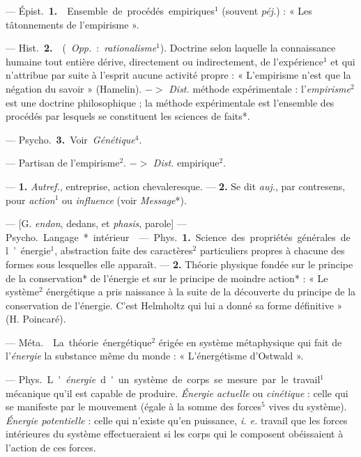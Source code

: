 \begin{itemize}[leftmargin=1cm, label=, itemsep=1pt]
 — \si{Épist.} {\bf 1.}  Ensemble de
procédés empiriques$^1$ (souvent  {\it péj.}) :
« Les tâtonnements de l’empirisme ».

— \si{Hist.} {\bf 2.}  ({\it Opp.}: {\it rationalisme}$^1$).
Doctrine selon laquelle la connaissance humaine tout entière dérive,
directement ou indirectement, de
l'expérience$^1$ et qui n’attribue par
suite à l'esprit aucune activité propre : « L’empirisme n’est que la
négation du savoir » (Hamelin).
$->$ {\it Dist.} méthode expérimentale : l'{\it empirisme}$^2$ est
une doctrine philosophique ; la méthode expérimentale est l'ensemble
des procédés par lesquels se constituent les sciences de faits*.

— \si{Psycho.} {\bf 3.} Voir {\it Génétique}$^4$.

 — Partisan de l'empirisme$^2$. $->$ {\it Dist.} empirique$^2$.

 — {\bf 1.} {\it Autref.}, entreprise, action chevaleresque. —
{\bf 2.} Se dit {\it auj.}, par contresens, pour {\it action}$^1$ ou {\it
influence} (voir {\it Message}*).

 — [G. {\it endon}, dedans, et {\it phasis}, parole]
— \si{Psycho.} Langage* intérieur.

 — \si{Phys.} {\bf 1.} Science des
propriétés générales de l’énergie$^1$,
abstraction faite des caractères$^2$
particuliers propres à chacune des
formes sous lesquelles elle apparaît.
— {\bf 2.} Théorie physique fondée sur
le principe de la conservation* de
l'énergie et sur le principe de moindre
action* : « Le système$^2$ énergétique
a pris naissance à la suite de la
découverte du principe
de la conservation de l'énergie. C’est
Helmholtz qui lui a donné sa forme
définitive » (H. Poincaré).

 — \si{Méta.}  La théorie
énergétique$^2$ érigée en système métaphysique qui fait de l'{\it énergie}
la substance même du monde : « L’énergétisme d'Ostwald ».

 — \si{Phys.} L'{\it énergie} d'un système de corps se mesure
par le travail$^1$ mécanique qu’il est capable
de produire. {\it Énergie actuelle} ou
{\it cinétique} : celle qui se manifeste par
le mouvement (égale à la somme
des forces$^5$ vives du système).
{\it Énergie potentielle} : celle qui n'existe
qu’en puissance, {\it i. e.} travail que les
forces intérieures du système effectueraient si les corps qui le composent obéissaient à l'action de ces
forces.


\end{itemize}
